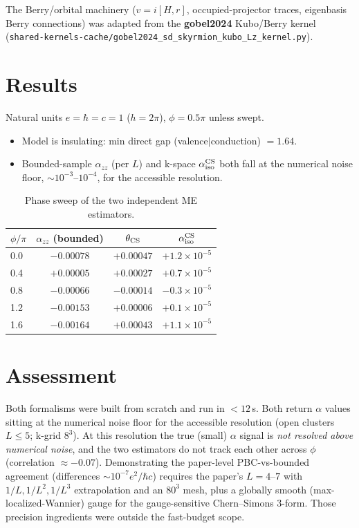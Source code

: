 \documentclass[11pt]{article}
\begin{document}
The Berry/orbital machinery ($v=i[H,r]$, occupied-projector traces, eigenbasis
Berry connections) was adapted from the \textbf{gobel2024} Kubo/Berry kernel
(\texttt{shared-kernels-cache/gobel2024\_sd\_skyrmion\_kubo\_Lz\_kernel.py}).

\section{Results}
Natural units $e=\hbar=c=1$ ($h=2\pi$), $\phi=0.5\pi$ unless swept.
\begin{itemize}
\item Model is insulating: min direct gap (valence$|$conduction) $=1.64$.
\item Bounded-sample $\alpha_{zz}$ (per $L$) and k-space $\alpha^{\rm CS}_{\rm iso}$
both fall at the numerical noise floor, $\sim10^{-3}$--$10^{-4}$, for the
accessible resolution.
\end{itemize}

\begin{table}[h]\centering
\begin{tabular}{lccc}
\toprule
$\phi/\pi$ & $\alpha_{zz}$ (bounded) & $\theta_{\rm CS}$ & $\alpha^{\rm CS}_{\rm iso}$\\
\midrule
0.0 & $-0.00078$ & $+0.00047$ & $+1.2\times10^{-5}$\\
0.4 & $+0.00005$ & $+0.00027$ & $+0.7\times10^{-5}$\\
0.8 & $-0.00066$ & $-0.00014$ & $-0.3\times10^{-5}$\\
1.2 & $-0.00153$ & $+0.00006$ & $+0.1\times10^{-5}$\\
1.6 & $-0.00164$ & $+0.00043$ & $+1.1\times10^{-5}$\\
\bottomrule
\end{tabular}
\caption{Phase sweep of the two independent ME estimators.}
\end{table}

\section{Assessment}
Both formalisms were built from scratch and run in $<12$\,s. Both return
$\alpha$ values sitting at the numerical noise floor for the accessible
resolution (open clusters $L\le5$; k-grid $8^3$). At this resolution the true
(small) $\alpha$ signal is \emph{not resolved above numerical noise}, and the two
estimators do not track each other across $\phi$ (correlation $\approx-0.07$).
Demonstrating the paper-level PBC-vs-bounded agreement (differences $\sim10^{-7}
e^2/\hbar c$) requires the paper's $L=4$--$7$ with $1/L,1/L^2,1/L^3$
extrapolation and an $80^3$ mesh, plus a globally smooth (max-localized-Wannier)
gauge for the gauge-sensitive Chern--Simons 3-form. Those precision ingredients
were outside the fast-budget scope.
\end{document}
